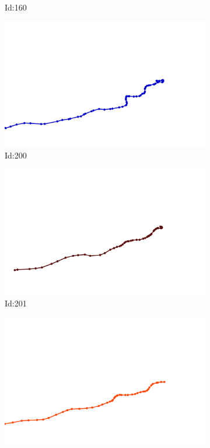 \documentclass[12pt,twoside]{report}
\begin{document}
\begin{figure}
\begin{subfigure}[b]{0.20\textwidth}
\caption{Id:160}
\end{subfigure}
\begin{subfigure}[b]{0.20\textwidth}
\centering
\includegraphics[width=\textwidth]{../trajectories/200.png}
\caption{Id:200}
\end{subfigure}
\begin{subfigure}[b]{0.20\textwidth}
\centering
\includegraphics[width=\textwidth]{../trajectories/201.png}
\caption{Id:201}
\end{subfigure}
\begin{subfigure}[b]{0.20\textwidth}
\centering
\includegraphics[width=\textwidth]{../trajectories/237.png}

\end{subfigure}
\end{figure}
\end{document}
